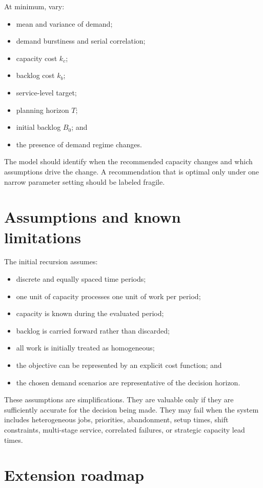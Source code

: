 \documentclass[11pt,a4paper]{article}
\begin{document}
At minimum, vary:
\begin{itemize}
  \item mean and variance of demand;
  \item demand burstiness and serial correlation;
  \item capacity cost $k_c$;
  \item backlog cost $k_b$;
  \item service-level target;
  \item planning horizon $T$;
  \item initial backlog $B_0$; and
  \item the presence of demand regime changes.
\end{itemize}

The model should identify when the recommended capacity changes and which assumptions drive the change. A recommendation that is optimal only under one narrow parameter setting should be labeled fragile.

\section{Assumptions and known limitations}

The initial recursion assumes:
\begin{itemize}
  \item discrete and equally spaced time periods;
  \item one unit of capacity processes one unit of work per period;
  \item capacity is known during the evaluated period;
  \item backlog is carried forward rather than discarded;
  \item all work is initially treated as homogeneous;
  \item the objective can be represented by an explicit cost function; and
  \item the chosen demand scenarios are representative of the decision horizon.
\end{itemize}

These assumptions are simplifications. They are valuable only if they are sufficiently accurate for the decision being made. They may fail when the system includes heterogeneous jobs, priorities, abandonment, setup times, shift constraints, multi-stage service, correlated failures, or strategic capacity lead times.

\section{Extension roadmap}
\end{document}
